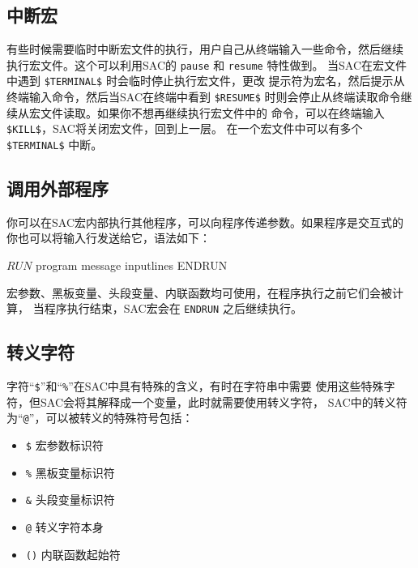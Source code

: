 \subsection{中断宏}
有些时候需要临时中断宏文件的执行，用户自己从终端输入一些命令，然后继续
执行宏文件。这个可以利用SAC的 \texttt{pause} 和 \texttt{resume} 特性做到。
当SAC在宏文件中遇到 \verb|$TERMINAL$| 时会临时停止执行宏文件，更改
提示符为宏名，然后提示从终端输入命令，然后当SAC在终端中看到 \verb|$RESUME$|
时则会停止从终端读取命令继续从宏文件读取。如果你不想再继续执行宏文件中的
命令，可以在终端输入 \verb|$KILL$|，SAC将关闭宏文件，回到上一层。
在一个宏文件中可以有多个 \verb|$TERMINAL$| 中断。

\subsection{调用外部程序}
你可以在SAC宏内部执行其他程序，可以向程序传递参数。如果程序是交互式的
你也可以将输入行发送给它，语法如下：
\begin{SACCode}
$RUN$ program message
inputlines
ENDRUN
\end{SACCode}
宏参数、黑板变量、头段变量、内联函数均可使用，在程序执行之前它们会被计算，
当程序执行结束，SAC宏会在 \texttt{ENDRUN} 之后继续执行。

\subsection{转义字符}
字符``\verb|$|''和``\verb|%|''在SAC中具有特殊的含义，有时在字符串中需要
使用这些特殊字符，但SAC会将其解释成一个变量，此时就需要使用转义字符，
SAC中的转义符为``\verb|@|''，可以被转义的特殊符号包括：
\begin{itemize}
\item \verb|$| 宏参数标识符
\item \verb|%| 黑板变量标识符
\item \verb|&| 头段变量标识符
\item \verb|@| 转义字符本身
\item \verb|()| 内联函数起始符
\end{itemize}
